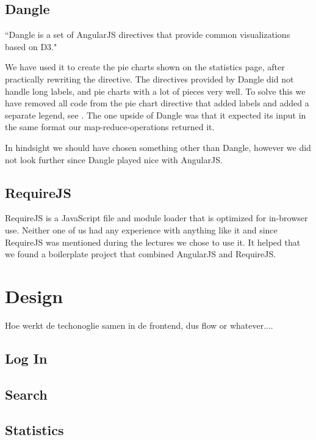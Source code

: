 	\subsection{Dangle}
	\label{ssec:1:dangle}
		``Dangle is a set of AngularJS directives that provide common visualizations based on D3."\cite{dangle}

		We have used it to create the pie charts shown on the statistics page, after practically rewriting the directive. The directives provided by Dangle did not handle long labels, and pie charts with a lot of pieces very well. To solve this we have removed all code from the pie chart directive that added labels and added a separate legend, see . The one upside of Dangle was that it expected its input in the same format our map-reduce-operations returned it. \\


		In hindsight we should have chosen something other than Dangle, however we did not look further since Dangle played nice with AngularJS. 

	\subsection{RequireJS}
	\label{ssec:1:requirejs}
		RequireJS is a JavaScript file and module loader that is optimized for in-browser use. Neither one of us had any experience with anything like it and since RequireJS was mentioned during the lectures we chose to use it. It helped that we found a boilerplate project that combined AngularJS and RequireJS. 

\section{Design}
\label{sec:1:design}
	Hoe werkt de techonoglie samen in de frontend, dus flow or whatever....

	\subsection{Log In}

	\subsection{Search}

	\subsection{Statistics}